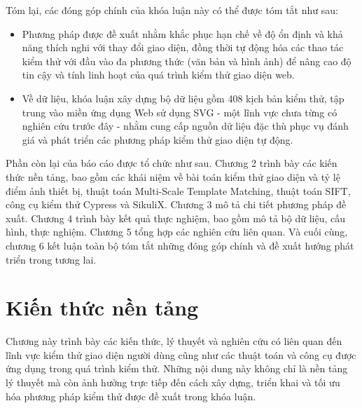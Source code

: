 \documentclass[a4paper, 12pt]{report}
\begin{document}
Tóm lại, các đóng góp chính của khóa luận này có thể được tóm tắt như sau:

\begin{itemize}
    \item Phương pháp được đề xuất nhằm khắc phục hạn chế về độ ổn định và khả năng thích nghi với thay đổi giao diện, đồng thời tự động hóa các thao tác kiểm thử với đầu vào đa phương thức (văn bản và hình ảnh) để nâng cao độ tin cậy và tính linh hoạt của quá trình kiểm thử giao diện web.
    \item Về dữ liệu, khóa luận xây dựng bộ dữ liệu gồm 408 kịch bản kiểm thử, tập trung vào miền ứng dụng Web sử dụng SVG - một lĩnh vực chưa từng có nghiên cứu trước đây - nhằm cung cấp nguồn dữ liệu đặc thù phục vụ đánh giá và phát triển các phương pháp kiểm thử giao diện tự động.
\end{itemize}






Phần còn lại của báo cáo được tổ chức như sau. Chương 2 trình bày các kiến thức nền tảng, bao gồm các khái niệm về bài toán kiểm thử giao diện và tỷ lệ điểm ảnh thiết bị, thuật toán Multi-Scale Template Matching, thuật toán SIFT, công cụ kiểm thử Cypress và SikuliX. Chương 3 mô tả chi tiết phương pháp đề xuất. Chương 4 trình bày kết quả thực nghiệm, bao gồm mô tả bộ dữ liệu, cấu hình, thực nghiệm. Chương 5 tổng hợp các nghiên cứu liên quan. Và cuối cùng, chương 6 kết luận toàn bộ tóm tắt những đóng góp chính và đề xuất hướng phát triển trong tương lai.




\chapter{Kiến thức nền tảng}

Chương này trình bày các kiến thức, lý thuyết và nghiên cứu có liên quan đến lĩnh vực kiểm thử giao diện người dùng cũng như các thuật toán và công cụ được ứng dụng trong quá trình kiểm thử. Những nội dung này không chỉ là nền tảng lý thuyết mà còn ảnh hưởng trực tiếp đến cách xây dựng, triển khai và tối ưu hóa phương pháp kiểm thử được đề xuất trong khóa luận.
\end{document}

